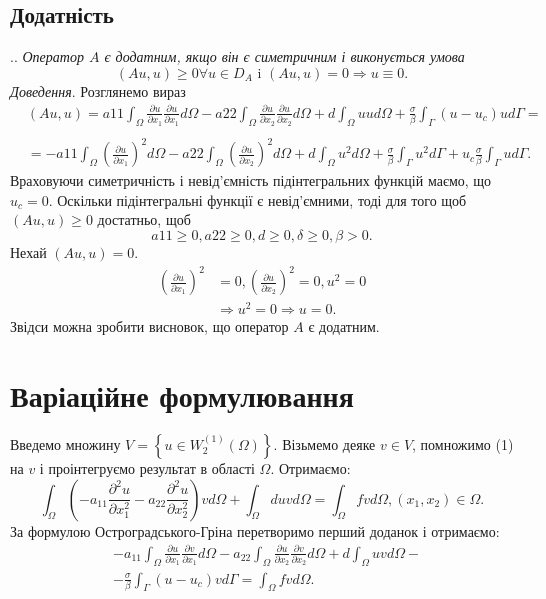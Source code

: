 \documentclass[12pt,a4paper, twoside]{article}
\begin{document}
{\subsection{Додатність}
{
{.}. \textit{Оператор $A$ є додатним, якщо він є симетричним і виконується умова}
$$(A u, u) \geq 0 \forall u \in D_{A} \text { i }(A u, u)=0 \Rightarrow u \equiv 0.$$
\textit{Доведення}. Розглянемо вираз
$$\begin{aligned}
&(A u, u)=a 11 \int_{\Omega}^{} \frac{\partial u}{\partial x_{1}} \frac{\partial u}{\partial x_{1}} d \Omega-a 22 \int_{\Omega} \frac{\partial u}{\partial x_{2}} \frac{\partial u}{\partial x_{2}} d \Omega+d \int_{\Omega} u u d \Omega+\frac{\sigma}{\beta} \int_{\Gamma}\left(u-u_{c}\right) u d \Gamma=\\\\
&=-a 11 \int_{\Omega}^{}\left(\frac{\partial u}{\partial x_{1}}\right)^{2} d \Omega-a 22 \int_{\Omega}^{}\left(\frac{\partial u}{\partial x_{2}}\right)^{2} d \Omega+d \int_{\Omega} u^{2} d \Omega+\frac{\sigma}{\beta} \int_{\Gamma} u^{2} d \Gamma+u_{c} \frac{\sigma}{\beta} \int_{\Gamma} u d \Gamma.
\end{aligned}$$
Враховуючи симетричність і невід'ємність підінтегральних функцій маємо, що $u_c=0$. Оскільки підінтегральні функції є невід’ємними, тоді для того щоб $(A u, u) \geq 0$ достатньо, щоб
$$a 11 \geq 0, a 22 \geq 0, d \geq 0, \delta \geq 0, \beta>0.$$
Нехай $(A u, u)=0$. 
$$\begin{aligned}
\left(\frac{\partial u}{\partial x_{1}}\right)^{2} &=0, \left(\frac{\partial u}{\partial x_{2}}\right)^{2}=0, u^{2}=0 \\
& \Rightarrow u^{2}=0 \Rightarrow u=0.
\end{aligned}$$
Звідси можна зробити висновок, що оператор $A$ є додатним.
}
}


\section{Варіаційне формулювання}
{
Введемо множину $V=\left\{u \in W_{2}^{(1)}(\Omega)\right\}$. Візьмемо деяке $v \in V$, помножимо (1) на $v$ і проінтегруємо результат в області $\Omega$. Отримаємо:
$$\int_{\Omega}\left(-a_{11} \frac{\partial^{2} u}{\partial x_{1}^{2}}-a_{22} \frac{\partial^{2} u}{\partial x_{2}^{2}}\right) v d \Omega+\int_{\Omega} d u v d \Omega=\int_{\Omega} f v d \Omega,\left(x_{1}, x_{2}\right) \in \Omega.$$
За формулою Остроградського-Гріна перетворимо перший доданок і отримаємо:
\begin{equation}\begin{aligned}
&-a_{11} \int_{\Omega} \frac{\partial u}{\partial x_{1}} \frac{\partial v}{\partial x_{1}} d \Omega-a_{22} \int_{\Omega} \frac{\partial u}{\partial x_{2}} \frac{\partial v}{\partial x_{2}} d \Omega+d \int_{\Omega} u v d \Omega-\\
&-\frac{\sigma}{\beta} \int_{\Gamma}\left(u-u_{c}\right) v d \Gamma=\int_{\Omega} f v d \Omega.
\end{aligned}\end{equation}
}
\end{document}
